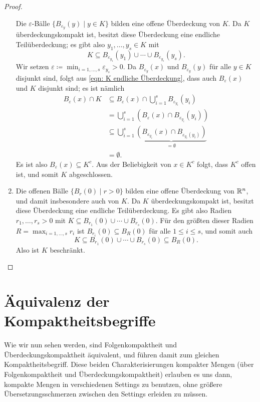 \documentclass[a4paper,10pt]{article}
\begin{document}
\begin{proof}
\begin{enumerate}
   Die $\varepsilon$-Bälle $\{B_{\varepsilon_y}(y) \mid y \in K\}$ bilden eine offene Überdeckung von $K$. Da $K$ überdeckungskompakt ist, besitzt diese Überdeckung eine endliche Teilüberdeckung; es gibt also $y_1, \dotsc, y_s \in K$ mit
   \begin{equation}\label{eqn: K endliche Überdeckung}
    K \subseteq B_{\varepsilon_{y_1}}(y_1) \cup \dotsb \cup B_{\varepsilon_{y_s}}(y_s).
   \end{equation}
   Wir setzen $\varepsilon \coloneqq \min_{i=1,\dotsc,s} \varepsilon_{y_s} > 0$. Da $B_{\varepsilon_y}(x)$ und $B_{\varepsilon_y}(y)$ für alle $y \in K$ disjunkt sind, folgt aus \eqref{eqn: K endliche Überdeckung}, dass auch $B_\varepsilon(x)$ und $K$ disjunkt sind; es ist nämlich
   \begin{align*}
    B_\varepsilon(x) \cap K
    &\subseteq B_\varepsilon(x) \cap \bigcup_{i=1}^s B_{\varepsilon_{y_i}}(y_i) \\
    &= \bigcup_{i=1}^s (B_\varepsilon(x) \cap B_{\varepsilon_{y_i}}(y_i)) \\
    &\subseteq \bigcup_{i=1}^s \underbrace{(B_{\varepsilon_{y_i}}(x) \cap B_{\varepsilon_{y_i}(y_i)})}_{= \emptyset} \\
    &= \emptyset.
   \end{align*}
   Es ist also $B_\varepsilon(x) \subseteq K^c$. Aus der Beliebigkeit von $x \in K^c$ folgt, dass $K^c$ offen ist, und somit $K$ abgeschlossen.
  \item
   Die offenen Bälle $\{B_r(0) \mid r > 0\}$ bilden eine offene Überdeckung von $\mathbb{R}^n$, und damit insbesondere auch von $K$. Da $K$ überdeckungskompakt ist, besitzt diese Überdeckung eine endliche Teilüberdeckung. Es gibt also Radien $r_1, \dotsc, r_s > 0$ mit $K \subseteq B_{r_1}(0) \cup \dotsb \cup B_{r_s}(0)$. Für den größten dieser Radien $R = \max_{i=1,\dotsc,s} r_i$ ist $B_{r_i}(0) \subseteq B_R(0)$ für alle $1 \leq i \leq s$, und somit auch
   \[
    K \subseteq B_{r_1}(0) \cup \dotsb \cup B_{r_s}(0) \subseteq B_R(0).
   \]
   Also ist $K$ beschränkt.
  \qedhere
 \end{enumerate}
\end{proof}





\section{Äquivalenz der Kompaktheitsbegriffe}
Wie wir nun sehen werden, sind Folgenkompaktheit und Überdeckungskompaktheit äquivalent, und führen damit zum gleichen Kompaktheitsbegriff. Diese beiden Charakterisierungen kompakter Mengen (über Folgenkompaktheit und Überdeckungskompaktheit) erlauben es uns dann, kompakte Mengen in verschiedenen Settings zu benutzen, ohne größere Übersetzungsschmerzen zwischen den Settings erleiden zu müssen.
\end{document}
